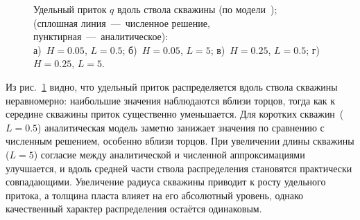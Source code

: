 \documentclass{article}
\begin{document}
\begin{figure}[H]
	\caption{
		Удельный приток $q$ вдоль ствола скважины (по модели~\cite{lit:kham_mazo_uzku_2015}); \\
		(сплошная линия~---~численное решение, пунктирная~---~аналитическое): \\
		а)~$H=0.05$, $L=0.5$; б)~$H=0.05$, $L=5$;
		в)~$H=0.25$, $L=0.5$; г)~$H=0.25$, $L=5$.
	}
	\label{fig:kham_rad_hypo_fault_q_l_mgrp}
\end{figure}

Из рис.~\ref{fig:kham_rad_hypo_fault_q_l_mgrp} видно, что удельный приток распределяется
вдоль ствола скважины неравномерно: наибольшие значения наблюдаются вблизи торцов,
тогда как к середине скважины приток существенно уменьшается. Для коротких скважин~($L=0.5$)
аналитическая модель заметно занижает значения по сравнению с численным решением, особенно
вблизи торцов. При увеличении длины скважины ($L=5$) согласие между аналитической и численной
аппроксимациями улучшается, и вдоль средней части ствола распределения становятся практически
совпадающими. Увеличение радиуса скважины приводит к росту удельного притока, а толщина пласта
влияет на его абсолютный уровень, однако качественный характер распределения остаётся одинаковым.


% 		
% 		

% 		
% 		
\end{document}
